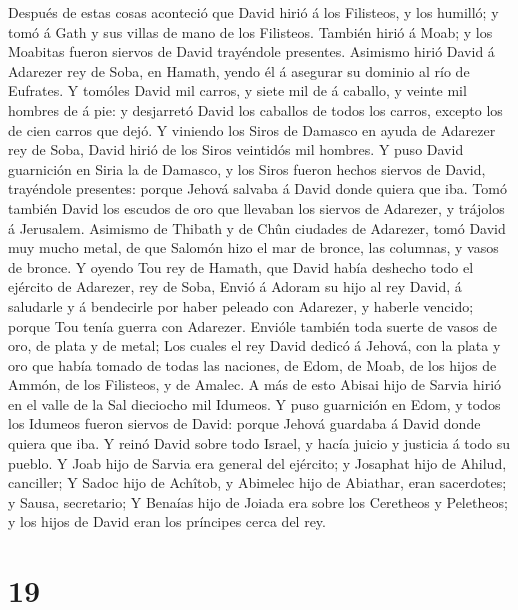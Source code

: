  Después de estas cosas aconteció que David hirió á los
Filisteos, y los humilló; y tomó á Gath y sus villas de mano de los
Filisteos.  También hirió á Moab; y los Moabitas fueron
siervos de David trayéndole presentes.  Asimismo hirió
David á Adarezer rey de Soba, en Hamath, yendo él á asegurar su dominio
al río de Eufrates.  Y tomóles David mil carros, y siete
mil de á caballo, y veinte mil hombres de á pie: y desjarretó David los
caballos de todos los carros, excepto los de cien carros que dejó.
 Y viniendo los Siros de Damasco en ayuda de Adarezer rey
de Soba, David hirió de los Siros veintidós mil hombres. 
Y puso David guarnición en Siria la de Damasco, y los Siros fueron
hechos siervos de David, trayéndole presentes: porque Jehová salvaba á
David donde quiera que iba.  Tomó también David los
escudos de oro que llevaban los siervos de Adarezer, y trájolos á
Jerusalem.  Asimismo de Thibath y de Chûn ciudades de
Adarezer, tomó David muy mucho metal, de que Salomón hizo el mar de
bronce, las columnas, y vasos de bronce.  Y oyendo Tou rey
de Hamath, que David había deshecho todo el ejército de Adarezer, rey de
Soba,  Envió á Adoram su hijo al rey David, á saludarle y
á bendecirle por haber peleado con Adarezer, y haberle vencido; porque
Tou tenía guerra con Adarezer. Envióle también toda suerte de vasos de
oro, de plata y de metal;  Los cuales el rey David dedicó
á Jehová, con la plata y oro que había tomado de todas las naciones, de
Edom, de Moab, de los hijos de Ammón, de los Filisteos, y de Amalec.
 A más de esto Abisai hijo de Sarvia hirió en el valle de
la Sal dieciocho mil Idumeos.  Y puso guarnición en Edom,
y todos los Idumeos fueron siervos de David: porque Jehová guardaba á
David donde quiera que iba.  Y reinó David sobre todo
Israel, y hacía juicio y justicia á todo su pueblo.  Y
Joab hijo de Sarvia era general del ejército; y Josaphat hijo de Ahilud,
canciller;  Y Sadoc hijo de Achîtob, y Abimelec hijo de
Abiathar, eran sacerdotes; y Sausa, secretario;  Y
Benaías hijo de Joiada era sobre los Ceretheos y Peletheos; y los hijos
de David eran los príncipes cerca del rey.

\hypertarget{section-18}{%
\section{19}\label{section-18}}

